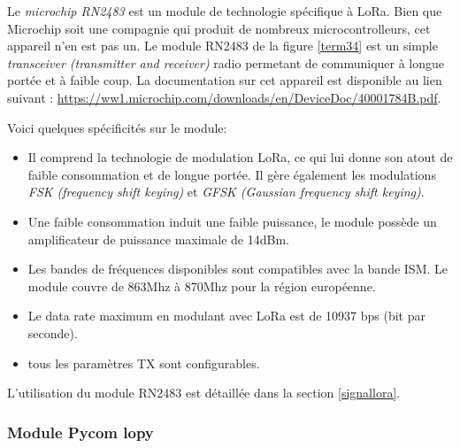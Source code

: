 Le \textit{microchip RN2483} est un module de technologie spécifique à LoRa. Bien que Microchip soit une compagnie qui produit de nombreux microcontrolleurs, cet appareil n'en est pas un. Le module RN2483 de la figure \ref{term34} est un simple \textit{transceiver (transmitter and receiver)} radio permetant de communiquer à longue portée et à faible coup. La documentation sur cet appareil est disponible au lien suivant : \href{https://ww1.microchip.com/downloads/en/DeviceDoc/40001784B.pdf}{https://ww1.microchip.com/downloads/en/DeviceDoc/40001784B.pdf}. 

\vspace{0.1cm}

Voici quelques spécificités sur le module:
\vspace{0.1cm}

\begin{itemize}
\item Il comprend la technologie de modulation LoRa, ce qui lui donne son atout de faible consommation et de longue portée. Il gère également les modulations \textit{FSK (frequency shift keying)} et \textit{GFSK (Gaussian frequency shift keying)}.
\item Une faible consommation induit une faible puissance, le module possède un amplificateur de puissance maximale de 14dBm.
\item Les bandes de fréquences disponibles sont compatibles avec la bande ISM. Le module couvre de 863Mhz à 870Mhz pour la région européenne.
\item Le data rate maximum en modulant avec LoRa est de 10937 bps (bit par seconde).
\item tous les paramètres TX sont configurables.
\end{itemize}

\vspace{0.1cm}

L'utilisation du module RN2483 est détaillée dans la section \ref{signallora}.

\subsubsection{Module Pycom lopy}

